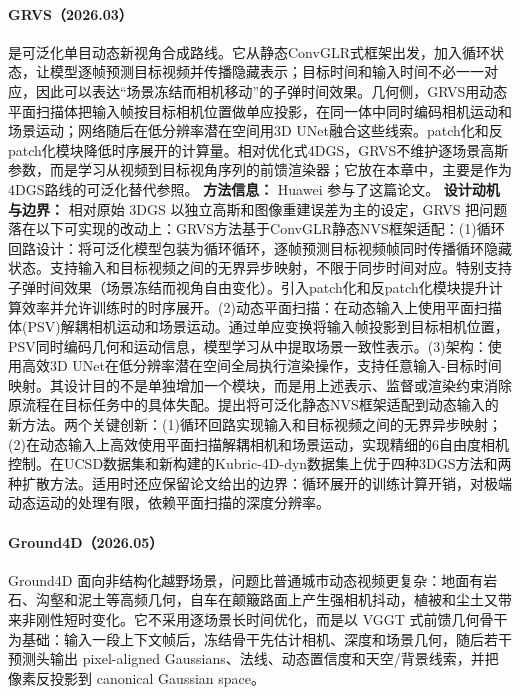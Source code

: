 \paragraph{GRVS（2026.03）\cite{2603_29734}}
是可泛化单目动态新视角合成路线。它从静态ConvGLR式框架出发，加入循环状态，让模型逐帧预测目标视频并传播隐藏表示；目标时间和输入时间不必一一对应，因此可以表达“场景冻结而相机移动”的子弹时间效果。几何侧，GRVS用动态平面扫描体把输入帧按目标相机位置做单应投影，在同一体中同时编码相机运动和场景运动；网络随后在低分辨率潜在空间用3D UNet融合这些线索。patch化和反patch化模块降低时序展开的计算量。相对优化式4DGS，GRVS不维护逐场景高斯参数，而是学习从视频到目标视角序列的前馈渲染器；它放在本章中，主要是作为4DGS路线的可泛化替代参照。
\textbf{方法信息：} Huawei 参与了这篇论文。
\textbf{设计动机与边界：} 相对原始 3DGS 以独立高斯和图像重建误差为主的设定，GRVS 把问题落在以下可实现的改动上：GRVS方法基于ConvGLR静态NVS框架适配：(1)循环回路设计：将可泛化模型包装为循环循环，逐帧预测目标视频帧同时传播循环隐藏状态。支持输入和目标视频之间的无界异步映射，不限于同步时间对应。特别支持子弹时间效果（场景冻结而视角自由变化）。引入patch化和反patch化模块提升计算效率并允许训练时的时序展开。(2)动态平面扫描：在动态输入上使用平面扫描体(PSV)解耦相机运动和场景运动。通过单应变换将输入帧投影到目标相机位置，PSV同时编码几何和运动信息，模型学习从中提取场景一致性表示。(3)架构：使用高效3D UNet在低分辨率潜在空间全局执行渲染操作，支持任意输入-目标时间映射。其设计目的不是单独增加一个模块，而是用上述表示、监督或渲染约束消除原流程在目标任务中的具体失配。提出将可泛化静态NVS框架适配到动态输入的新方法。两个关键创新：(1)循环回路实现输入和目标视频之间的无界异步映射；(2)在动态输入上高效使用平面扫描解耦相机和场景运动，实现精细的6自由度相机控制。在UCSD数据集和新构建的Kubric-4D-dyn数据集上优于四种3DGS方法和两种扩散方法。适用时还应保留论文给出的边界：循环展开的训练计算开销，对极端动态运动的处理有限，依赖平面扫描的深度分辨率。
\paragraph{Ground4D（2026.05）\cite{2605_04435}}
Ground4D 面向非结构化越野场景，问题比普通城市动态视频更复杂：地面有岩石、沟壑和泥土等高频几何，自车在颠簸路面上产生强相机抖动，植被和尘土又带来非刚性短时变化。它不采用逐场景长时间优化，而是以 VGGT 式前馈几何骨干为基础：输入一段上下文帧后，冻结骨干先估计相机、深度和场景几何，随后若干预测头输出 pixel-aligned Gaussians、法线、动态置信度和天空/背景线索，并把像素反投影到 canonical Gaussian space。

